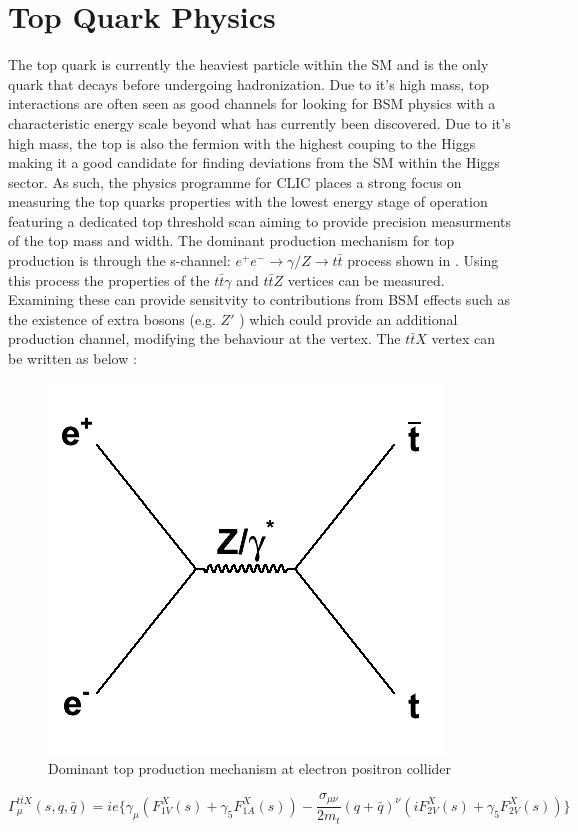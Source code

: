 \section{Top Quark Physics}


The top quark is currently the heaviest particle within the \ac{SM} and is the only quark that decays before undergoing hadronization. Due to it's high mass, top interactions are often seen as good channels for looking for \ac{BSM} physics with a characteristic energy scale beyond what has currently been discovered. Due to it's high mass, the top is also the fermion with the highest couping to the Higgs making it a good candidate for finding deviations from the \ac{SM} within the Higgs sector. As such, the physics programme for \ac{CLIC} places a strong focus on measuring the top quarks properties with the lowest energy stage of operation featuring a dedicated top threshold scan aiming to provide precision measurments of the top mass and width. The dominant production mechanism for top production is through the s-channel: $e^+e^-\rightarrow\gamma /Z\rightarrow t\bar{t}$ process shown in . Using this process the properties of the $t\bar{t}\gamma$ and $t\bar{t}Z$ vertices can be measured. Examining these can provide sensitvity to contributions from \ac{BSM} effects such as the existence of extra bosons (e.g. $Z'$ \cite{Langacker:2008yv}) which could provide an additional production channel, modifying the behaviour at the vertex. The  $t\bar{t}X$ vertex can be written as below \cite{Amjad:2015mma}:

\begin{figure}
\centering
\includegraphics[width=0.35\linewidth]{Theory/fig/ttFeynmann}
\caption[Dominant top production mechanism at electron positron colliders]{Dominant top production mechanism at electron positron collider}
\label{fig:topFeynmann}
\end{figure}

\begin{equation}
\Gamma_{\mu}^{t\bar{t}X}(s,q,\bar{q})= ie\{ \gamma_{\mu}(F_{1V}^{X}(s)+ \gamma_{5}F_{1A}^{X}(s)) - \frac{\sigma_{\mu\nu}}{2m_t}(q+\bar{q})^{\nu}(iF_{2V}^{X}(s) + \gamma_{5}F_{2V}^{X}(s))\}
\end{equation}


